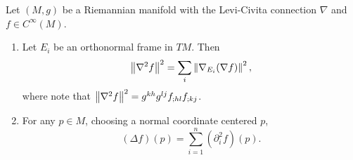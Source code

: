 \begin{lem}
    Let $(M,g)$ be a Riemannian manifold with the Levi-Civita connection $\nabla$ and $f \in C^\infty(M)$.
    \begin{enumerate}[label=(\arabic{*})]
        \item Let $E_i$ be an orthonormal frame in $TM$. Then 
        \begin{equation*}
            \left\lVert\nabla^2 f\right\lVert^2 = \sum_i \left\lVert\nabla_{E_i} (\nabla f)\right\lVert^2,
        \end{equation*}
        where note that $\left\lVert\nabla^2 f\right\lVert^2 = g^{kh}g^{lj}f_{;hl}f_{;kj}$.

        \item For any $p \in M$, choosing a normal coordinate centered $p$,
        \begin{equation*}
            (\Delta f)(p) = \sum_{i=1}^n (\partial_i^2 f)(p).
        \end{equation*}
    \end{enumerate}
\end{lem}
